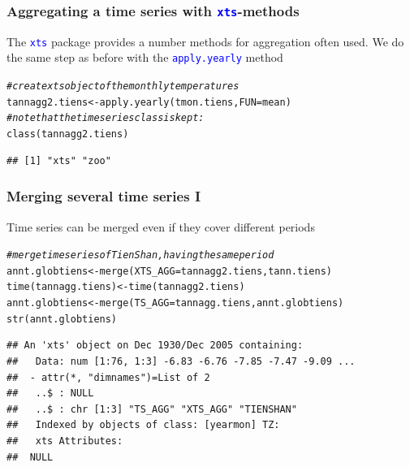 \documentclass[xcolor=table, xcolor=dvipsnames]{beamer}\usepackage[]{graphicx}\usepackage[]{color}
\makeatletter
\newcommand{\hlcom}[1]{\textcolor[rgb]{0,0.392,0}{\textit{#1}}}
\newcommand{\hlstd}[1]{\textcolor[rgb]{0,0,0}{#1}}
\newcommand{\hlkwb}[1]{\textcolor[rgb]{0,0,0}{#1}}
\newcommand{\hlkwc}[1]{\textcolor[rgb]{1,0,1}{#1}}
\newcommand{\hlkwd}[1]{\textcolor[rgb]{0,0,1}{#1}}
\newenvironment{kframe}{%
 \def\at@end@of@kframe{}%
 \ifinner\ifhmode%
  \def\at@end@of@kframe{\end{minipage}}%
  \begin{minipage}{\columnwidth}%
 \fi\fi%
 \def\FrameCommand##1{\hskip\@totalleftmargin \hskip-\fboxsep
 \colorbox{shadecolor}{##1}\hskip-\fboxsep
     \hskip-\linewidth \hskip-\@totalleftmargin \hskip\columnwidth}%
 \MakeFramed {\advance\hsize-\width
   \@totalleftmargin\z@ \linewidth\hsize
   \@setminipage}}%
 {\par\unskip\endMakeFramed%
 \at@end@of@kframe}
\newenvironment{knitrout}{}{} %
\newcommand{\rcode}[1]{\texttt{\textcolor{Blue}{#1}}} %
\makeatother
\begin{document}
\begin{frame}[fragile]\frametitle{Aggregating a time series with \rcode{xts}-methods}
The \rcode{xts} package provides a number methods for aggregation often used.
We do the same step as before with the \rcode{apply.yearly} method 
\begin{knitrout}
\color{fgcolor}\begin{kframe}
\begin{alltt}
\hlcom{# create xts object of the monthly temperatures}
\hlstd{tannagg2.tiens} \hlkwb{<-} \hlkwd{apply.yearly}\hlstd{(tmon.tiens,} \hlkwc{FUN}\hlstd{=mean)}
\hlcom{# note that the time series class is kept:}
\hlkwd{class}\hlstd{(tannagg2.tiens)}
\end{alltt}
\begin{verbatim}
## [1] "xts" "zoo"
\end{verbatim}
\end{kframe}
\end{knitrout}
\end{frame}


\begin{frame}[fragile]\frametitle{Merging several time series I}
Time series can be merged even if they cover different periods
\begin{knitrout}\small
{}\color{fgcolor}\begin{kframe}
\begin{alltt}
\hlcom{# merge time series of Tien Shan, having the same period}
\hlstd{annt.globtiens} \hlkwb{<-} \hlkwd{merge}\hlstd{(}\hlkwc{XTS_AGG}\hlstd{=tannagg2.tiens, tann.tiens)}
\hlkwd{time}\hlstd{(tannagg.tiens)} \hlkwb{<-} \hlkwd{time}\hlstd{(tannagg2.tiens)}
\hlstd{annt.globtiens} \hlkwb{<-} \hlkwd{merge}\hlstd{(}\hlkwc{TS_AGG}\hlstd{=tannagg.tiens, annt.globtiens)}
\hlkwd{str}\hlstd{(annt.globtiens)}
\end{alltt}
\begin{verbatim}
## An 'xts' object on Dec 1930/Dec 2005 containing:
##   Data: num [1:76, 1:3] -6.83 -6.76 -7.85 -7.47 -9.09 ...
##  - attr(*, "dimnames")=List of 2
##   ..$ : NULL
##   ..$ : chr [1:3] "TS_AGG" "XTS_AGG" "TIENSHAN"
##   Indexed by objects of class: [yearmon] TZ: 
##   xts Attributes:  
##  NULL
\end{verbatim}
\end{kframe}
\end{knitrout}
\end{frame}
\end{document}
